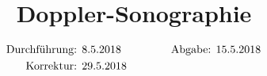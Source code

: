 

\subject{US3}
\title{Doppler-Sonographie}

\date{
  \begin{align}
    \text{Durchführung: } & \text{8.5.2018} & \hspace{3em} & \text{Abgabe: 15.5.2018} \notag
\\  \text{Korrektur: } & \text{29.5.2018} & \hspace {3em} & \notag
  \end{align}
}




\maketitle
\thispagestyle{empty}
\tableofcontents
\newpage






\nocite{*}
\printbibliography{}


